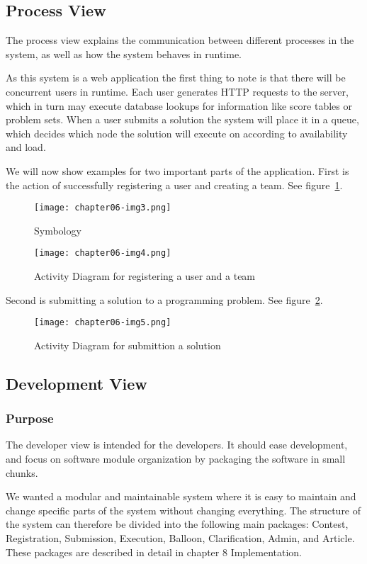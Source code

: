 \subsection{Process View}
The process view explains the communication between different processes
in the system, as well as how the system behaves in runtime. 

As this system is a web application the first thing to note is that
there will be concurrent users in runtime. Each user generates HTTP
requests to the server, which in turn may execute database lookups for
information like score tables or problem sets. When a user submits a
solution the system will place it in a queue, which decides which node
the solution will execute on according to availability and load. 

We will now show examples for two important parts of the application.
First is the action of successfully registering a user and creating a
team. See figure~\ref{fig:actRegister}.
\begin{figure}[h!]
    \centering
	\texttt{[image: chapter06-img3.png]} 
	\caption{Symbology}
\end{figure}

\begin{figure}[h]
	\texttt{[image: chapter06-img4.png]} 
	\caption{Activity Diagram for registering a user and a team}
	\label{fig:actRegister}
\end{figure}

Second is submitting a solution to a programming problem. See figure~\ref{fig:actSubmit}.
\begin{figure}[h]
	\texttt{[image: chapter06-img5.png]}
	\caption{Activity Diagram for submittion a solution}
	\label{fig:actSubmit}
\end{figure}

\subsection{Development View}
\subsubsection{Purpose}

The developer view is intended for the developers. It should ease
development, and focus on software module organization by packaging the
software in small chunks.

We wanted a modular and maintainable system where it is easy to maintain
and change specific parts of the system without changing everything.
The structure of the system can therefore be divided into the following
main packages: Contest, Registration, Submission, Execution, Balloon,
Clarification, Admin, and Article. These packages are described in
detail in chapter 8 Implementation. 

